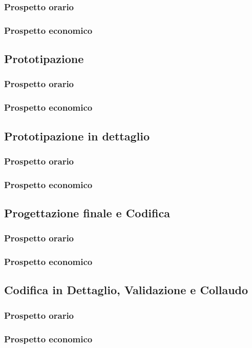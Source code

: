 \subsubsection{Prospetto orario}
\subsubsection{Prospetto economico}

\subsection{Prototipazione}
\subsubsection{Prospetto orario}
\subsubsection{Prospetto economico}

\subsection{Prototipazione in dettaglio}
\subsubsection{Prospetto orario}
\subsubsection{Prospetto economico}

\subsection{Progettazione finale e Codifica}
\subsubsection{Prospetto orario}
\subsubsection{Prospetto economico}

\subsection{Codifica in Dettaglio, Validazione e Collaudo}
\subsubsection{Prospetto orario}
\subsubsection{Prospetto economico}